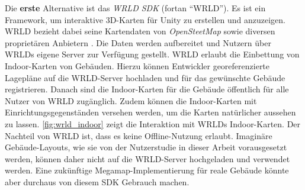 Die \textbf{erste} Alternative ist das \emph{WRLD SDK} (fortan \enquote{WRLD}).
Es ist ein Framework, um interaktive 3D-Karten für Unity zu erstellen und anzuzeigen.
WRLD bezieht dabei seine Kartendaten von \emph{OpenSteetMap} sowie diversen proprietären Anbietern \parencite{WRLD2018}.
Die Daten werden aufbereitet und Nutzern über WRLDs eigene Server zur Verfügung gestellt.
WRLD erlaubt die Einbettung von Indoor-Karten von Gebäuden.
Hierzu können Entwickler georeferenzierte Lagepläne auf die WRLD-Server hochladen und für das gewünschte Gebäude registrieren.
Danach sind die Indoor-Karten für die Gebäude öffentlich für alle Nutzer von WRLD zugänglich.
Zudem können die Indoor-Karten mit Einrichtungsgegenständen versehen werden, um die Karten natürlicher aussehen zu lassen.
\autoref{fig:wrld_indoor} zeigt die Interaktion mit WRLDs Indoor-Karten.
Der Nachteil von WRLD ist, dass es keine Offline-Nutzung erlaubt.
Imaginäre Gebäude-Layouts, wie sie von der Nutzerstudie in dieser Arbeit vorausgesetzt werden, können daher nicht auf die WRLD-Server hochgeladen und verwendet werden.
Eine zukünftige Megamap-Implementierung für reale Gebäude könnte aber durchaus von diesem SDK Gebrauch machen.
